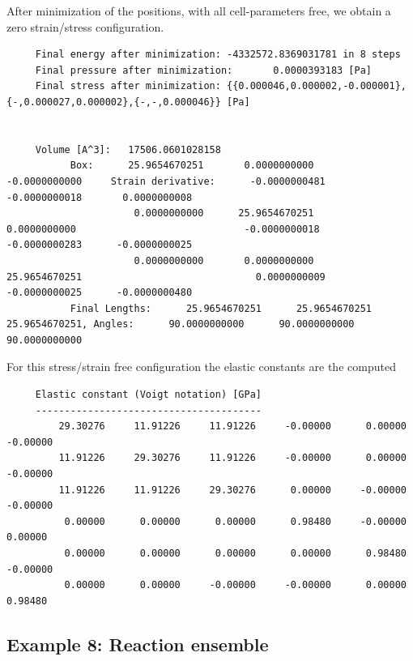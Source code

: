 \noindent
After minimization of the positions, with all cell-parameters free, we obtain a zero strain/stress configuration.
\begin{tiny}
\begin{verbatim}
     Final energy after minimization: -4332572.8369031781 in 8 steps
     Final pressure after minimization:       0.0000393183 [Pa]
     Final stress after minimization: {{0.000046,0.000002,-0.000001},{-,0.000027,0.000002},{-,-,0.000046}} [Pa]
     
     
     Volume [A^3]:   17506.0601028158
           Box:      25.9654670251       0.0000000000      -0.0000000000     Strain derivative:      -0.0000000481      -0.0000000018       0.0000000008
                      0.0000000000      25.9654670251       0.0000000000                             -0.0000000018      -0.0000000283      -0.0000000025
                      0.0000000000       0.0000000000      25.9654670251                              0.0000000009      -0.0000000025      -0.0000000480
           Final Lengths:      25.9654670251      25.9654670251      25.9654670251, Angles:      90.0000000000      90.0000000000      90.0000000000
\end{verbatim}
\end{tiny}

\noindent
For this stress/strain free configuration the elastic constants are the computed
\begin{tiny}
\begin{verbatim}
     Elastic constant (Voigt notation) [GPa]
     ---------------------------------------
         29.30276     11.91226     11.91226     -0.00000      0.00000     -0.00000
         11.91226     29.30276     11.91226     -0.00000      0.00000     -0.00000
         11.91226     11.91226     29.30276      0.00000     -0.00000     -0.00000
          0.00000      0.00000      0.00000      0.98480     -0.00000      0.00000
          0.00000      0.00000      0.00000      0.00000      0.98480     -0.00000
          0.00000      0.00000     -0.00000     -0.00000      0.00000      0.98480
\end{verbatim}
\end{tiny}

\subsection*{Example 8: Reaction ensemble}

